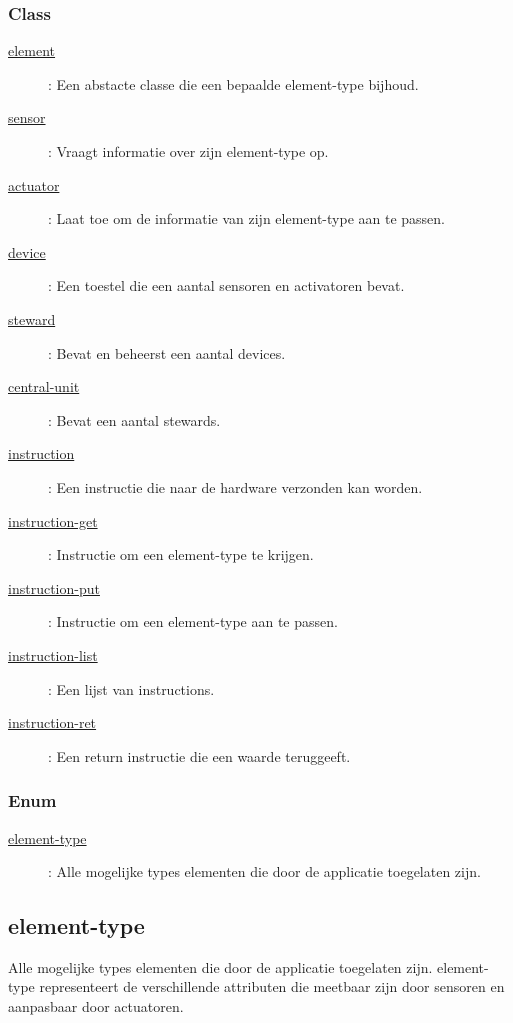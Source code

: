 \documentclass{article}
\begin{document}
\subsubsection{Class}
\begin{description}
\item[\hyperlink{element}{element}] : Een abstacte classe die een bepaalde element-type bijhoud.
\item[\hyperlink{sensor}{sensor}] : Vraagt informatie over zijn element-type op.
\item[\hyperlink{actuator}{actuator}] : Laat toe om de informatie van zijn element-type aan te passen.
\item[\hyperlink{device}{device}] : Een toestel die een aantal sensoren en activatoren bevat.
\item[\hyperlink{steward}{steward}] : Bevat en beheerst een aantal devices.
\item[\hyperlink{central-unit}{central-unit}] : Bevat een aantal stewards.
\item[\hyperlink{instruction}{instruction}] : Een instructie die naar de hardware verzonden kan worden.
\item[\hyperlink{instruction-get}{instruction-get}] : Instructie om een element-type te krijgen.
\item[\hyperlink{instruction-put}{instruction-put}] : Instructie om een element-type aan te passen.
\item[\hyperlink{instruction-list}{instruction-list}] : Een lijst van instructions.
\item[\hyperlink{instruction-ret}{instruction-ret}] : Een return instructie die een waarde teruggeeft.
\end{description}

\subsubsection{Enum}
\begin{description}
\item[\hyperlink{element-type}{element-type}] : Alle mogelijke types elementen die door de applicatie toegelaten zijn.
\end{description}

\newpage
\hypertarget{element-type}{\subsection{element-type}}
Alle mogelijke types elementen die door de applicatie toegelaten zijn. element-type representeert de verschillende attributen die meetbaar zijn door sensoren en aanpasbaar door actuatoren.
\end{document}
